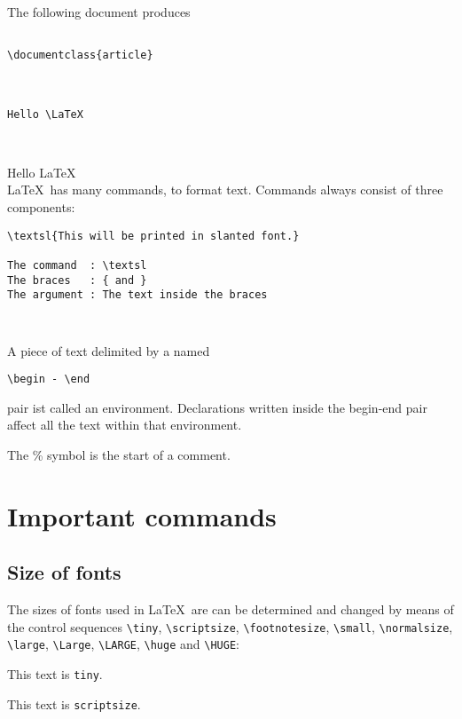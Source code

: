 The following document produces

\begin{verbatim}

\documentclass{article}



Hello \LaTeX



\end{verbatim}

Hello \LaTeX\\



\LaTeX\ has many commands, to format text.
Commands always consist of three components:

\begin{verbatim}
\textsl{This will be printed in slanted font.}

The command  : \textsl
The braces   : { and }
The argument : The text inside the braces
\end{verbatim} 



\begin{verbatim}


\end{verbatim}

A piece of text delimited by a named 
\begin{verbatim}
\begin - \end
\end{verbatim}
 pair ist called an environment.
Declarations written inside the begin-end pair affect all the text within that environment.

The \% symbol is the start of a comment.


\section{Important commands}

\subsection{Size of fonts}
The sizes of fonts used in \LaTeX\ are can be determined
and changed by means of the control sequences
\verb/\tiny/,
\verb/\scriptsize/,
\verb/\footnotesize/,
\verb/\small/,
\verb/\normalsize/,
\verb/\large/,
\verb/\Large/,
\verb/\LARGE/,
\verb/\huge/ and
\verb/\HUGE/:


{\tiny This text is \texttt{tiny}}.

{\scriptsize This text is \texttt{scriptsize}}.

